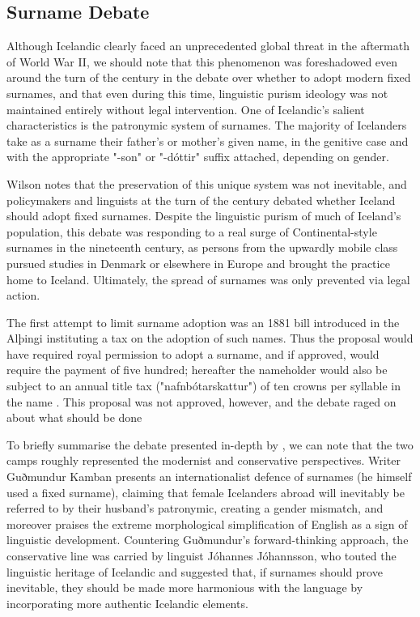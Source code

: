 \subsection{Surname Debate}

Although Icelandic clearly faced an unprecedented global threat in the
aftermath of World War II, we should note that this phenomenon was foreshadowed
even around the turn of the century in the debate over whether to adopt modern
fixed surnames, and that even during this time, linguistic purism ideology was
not maintained entirely without legal intervention. One of Icelandic's salient
characteristics is the patronymic system of surnames. The majority of
Icelanders take as a surname their father's or mother's given name, in the
genitive case and with the appropriate "-son" or "-dóttir" suffix attached,
depending on gender.

Wilson notes that the preservation of this unique system was not inevitable,
and policymakers and linguists at the turn of the century debated whether
Iceland should adopt fixed surnames. Despite the linguistic purism of much of
Iceland's population, this debate was responding to a real surge of
Continental-style surnames in the nineteenth century, as persons from the
upwardly mobile class pursued studies in Denmark or elsewhere in Europe and
brought the practice home to Iceland. Ultimately, the spread of surnames was
only prevented via legal action.

The first attempt to limit surname adoption was an 1881 bill introduced in the
Alþingi instituting a tax on the adoption of such names. Thus the proposal
would have required royal permission to adopt a surname, and if approved, would
require the payment of five hundred; hereafter the nameholder would also be
subject to an annual title tax ("nafnbótarskattur") of ten crowns per syllable
in the name \parencite[137]{willson02}. This proposal was not approved,
however, and the debate raged on about what should be done

To briefly summarise the debate presented in-depth by \textcite{willson02}, we
can note that the two camps roughly represented the modernist and conservative
perspectives. Writer Guðmundur Kamban presents an internationalist defence of
surnames (he himself used a fixed surname), claiming that female Icelanders
abroad will inevitably be referred to by their husband's patronymic, creating a
gender mismatch, and moreover praises the extreme morphological simplification
of English as a sign of linguistic development. Countering Guðmundur's
forward-thinking approach, the conservative line was carried by linguist
Jóhannes Jóhannsson, who touted the linguistic heritage of Icelandic and
suggested that, if surnames should prove inevitable, they should be made more
harmonious with the language by incorporating more authentic Icelandic
elements.

